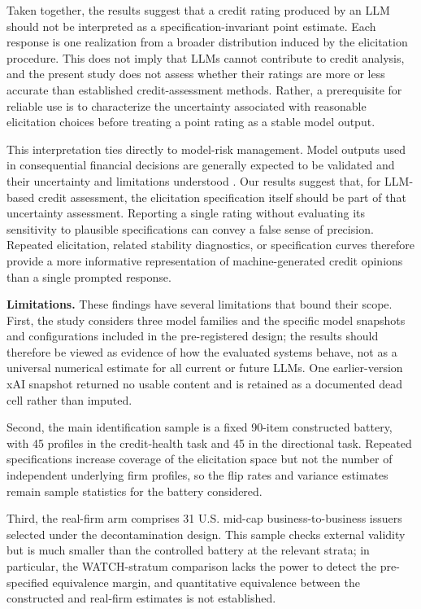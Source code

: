 \documentclass[pdflatex,sn-nature,lineno]{sn-jnl}
\theoremstyle{thmstyleone}
\begin{document}
Taken together, the results suggest that a credit rating produced by an LLM should not be interpreted as a
specification-invariant point estimate. Each response is one realization from a broader distribution induced
by the elicitation procedure. This does not imply that LLMs cannot contribute to credit analysis, and the
present study does not assess whether their ratings are more or less accurate than established
credit-assessment methods. Rather, a prerequisite for reliable use is to characterize the uncertainty
associated with reasonable elicitation choices before treating a point rating as a stable model output.

This interpretation ties directly to model-risk management. Model outputs used in consequential financial
decisions are generally expected to be validated and their uncertainty and limitations understood
\cite{srletter2011}. Our results suggest that, for LLM-based credit assessment, the elicitation
specification itself should be part of that uncertainty assessment. Reporting a single rating without
evaluating its sensitivity to plausible specifications can convey a false sense of precision. Repeated
elicitation, related stability diagnostics, or specification curves therefore provide a more informative
representation of machine-generated credit opinions than a single prompted response.

\noindent\textbf{Limitations.} These findings have several limitations that bound their scope. First, the study considers three model
families and the specific model snapshots and configurations included in the pre-registered design; the
results should therefore be viewed as evidence of how the evaluated systems behave, not as a universal
numerical estimate for all current or future LLMs. One earlier-version xAI snapshot returned no usable
content and is retained as a documented dead cell rather than imputed.

Second, the main identification sample is a fixed 90-item constructed battery, with 45 profiles in the
credit-health task and 45 in the directional task. Repeated specifications increase coverage of the
elicitation space but not the number of independent underlying firm profiles, so the flip rates and
variance estimates remain sample statistics for the battery considered.

Third, the real-firm arm comprises 31 U.S. mid-cap business-to-business issuers selected under the
decontamination design. This sample checks external validity but is much smaller than the controlled
battery at the relevant strata; in particular, the WATCH-stratum comparison lacks the power to detect the
pre-specified equivalence margin, and quantitative equivalence between the constructed and real-firm
estimates is not established.
\end{document}
